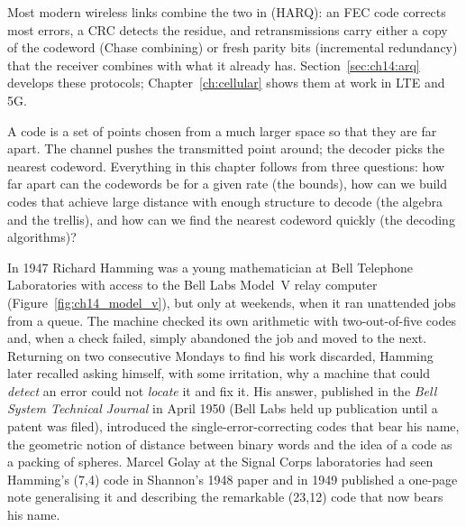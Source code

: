 
Most modern wireless links combine the two in  (HARQ): an FEC code corrects most
errors, a CRC detects the residue, and retransmissions carry either a copy of the codeword (Chase
combining) or fresh parity bits (incremental redundancy) that the receiver combines with what it
already has. Section~\ref{sec:ch14:arq} develops these protocols; Chapter~\ref{ch:cellular} shows them
at work in LTE and 5G.

\begin{keyidea}
A code is a set of points chosen from a much larger space so that they are far apart. The
channel pushes the transmitted point around; the decoder picks the nearest codeword. Everything
in this chapter follows from three questions: how far apart can the codewords be for a given rate
(the bounds), how can we build codes that achieve large distance with enough structure to decode
(the algebra and the trellis), and how can we find the nearest codeword quickly (the decoding
algorithms)?
\end{keyidea}


\begin{history}
In 1947 Richard Hamming was a young mathematician at Bell Telephone Laboratories with access to
the Bell Labs Model~V relay computer (Figure~\ref{fig:ch14_model_v}), but only at weekends, when it
ran unattended jobs from a queue. The machine checked its own arithmetic with two-out-of-five codes
and, when a check failed, simply abandoned the job and moved to the next. Returning on two
consecutive Mondays to find his work discarded, Hamming later recalled asking himself, with some
irritation, why a machine that could \emph{detect} an error could not \emph{locate} it and fix it.
His answer, published in the \emph{Bell System Technical Journal} in April 1950 (Bell Labs held up
publication until a patent was filed), introduced the single-error-correcting codes that bear his
name, the geometric notion of distance between binary words and the idea of a code as a packing of
spheres. Marcel Golay at the Signal Corps laboratories had seen Hamming's (7,4) code in Shannon's
1948 paper and in 1949 published a one-page note generalising it and describing the remarkable
(23,12) code that now bears his name.
\end{history}

